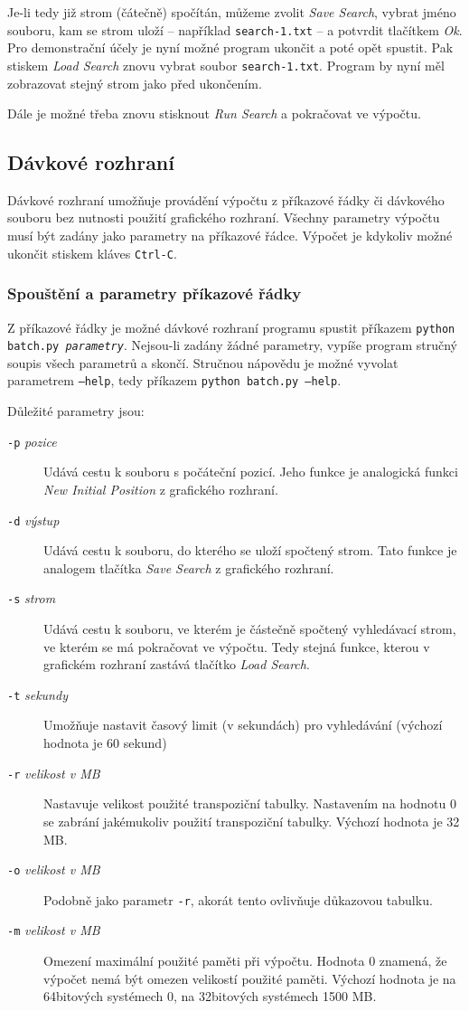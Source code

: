 \documentclass{article}
\begin{document}
Je-li tedy již strom (čátečně) spočítán, můžeme zvolit \emph{Save Search},
vybrat jméno souboru, kam se strom uloží -- například \texttt{search-1.txt} -- 
a potvrdit tlačítkem \emph{Ok}. Pro demonstrační účely je nyní možné program 
ukončit a poté opět spustit. Pak stiskem \emph{Load Search} znovu vybrat soubor
\texttt{search-1.txt}. Program by nyní měl zobrazovat stejný strom jako před 
ukončením.

Dále je možné třeba znovu stisknout \emph{Run Search} a pokračovat ve výpočtu.

\subsection{Dávkové rozhraní}
Dávkové rozhraní umožňuje provádění výpočtu z příkazové řádky či dávkového
souboru bez nutnosti použití grafického rozhraní. Všechny parametry výpočtu musí 
být zadány jako parametry na příkazové řádce. Výpočet je kdykoliv možné ukončit
stiskem kláves \texttt{Ctrl-C}.

\subsubsection{Spouštění a parametry příkazové řádky}
Z příkazové řádky je možné dávkové rozhraní programu spustit příkazem
\texttt{python batch.py \textit{parametry}}.
Nejsou-li zadány žádné parametry, vypíše program stručný soupis všech parametrů
a skončí. Stručnou nápovědu je možné
vyvolat parametrem \texttt{--help}, tedy příkazem \texttt{python batch.py
--help}.

Důležité parametry jsou:\begin{description}
\item[\texttt{-p} \textit{pozice}] Udává cestu k souboru s počáteční pozicí.
  Jeho funkce je analogická funkci \emph{New Initial Position} z grafického 
  rozhraní.
\item[\texttt{-d} \textit{výstup}] Udává cestu k souboru, do kterého se uloží
  spočtený strom. Tato funkce je analogem tlačítka \emph{Save Search} z 
  grafického rozhraní.
\item[\texttt{-s} \textit{strom}] Udává cestu k souboru, ve kterém je částečně
  spočtený vyhledávací strom, ve kterém se má pokračovat ve výpočtu. Tedy stejná
  funkce, kterou v grafickém rozhraní zastává tlačítko \emph{Load Search}.
\item[\texttt{-t} \textit{sekundy}] Umožňuje nastavit časový limit (v sekundách) 
  pro vyhledávání (výchozí hodnota je 60 sekund)
\item[\texttt{-r} \textit{velikost v MB}] Nastavuje velikost použité transpoziční 
  tabulky. Nastavením na hodnotu 0 se zabrání jakémukoliv použití transpoziční 
  tabulky. Výchozí hodnota je 32 MB. 
\item[\texttt{-o} \textit{velikost v MB}] Podobně jako parametr \texttt{-r},
  akorát tento ovlivňuje důkazovou tabulku.
\item[\texttt{-m} \textit{velikost v MB}] Omezení maximální použité paměti při 
  výpočtu. Hodnota 0 znamená, že výpočet nemá být omezen velikostí použité
  paměti. Výchozí hodnota je na 64bitových systémech 0, na 32bitových systémech
  1500 MB.
\end{description}
\end{document}

